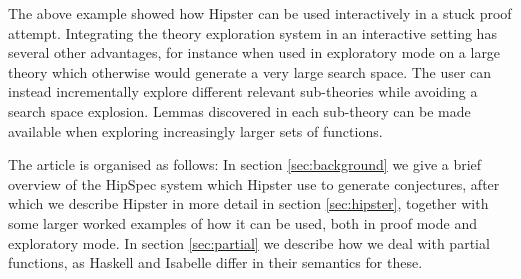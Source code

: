 

% 
The above example showed how Hipster can be used interactively in a stuck proof attempt. Integrating the theory exploration system in an interactive setting has several other advantages, for instance when used in exploratory mode on a large theory which otherwise would generate a very large search space. The user can instead incrementally explore different relevant sub-theories while avoiding a search space explosion. Lemmas discovered in each sub-theory can be made available when exploring increasingly larger sets of functions. 

The article is organised as follows: In section \ref{sec:background} we give a brief overview of the HipSpec system which Hipster use to generate conjectures, after which we describe Hipster in more detail in section \ref{sec:hipster}, together with some larger worked examples of how it can be used, both in proof mode and exploratory mode. In section \ref{sec:partial} we describe how we deal with partial functions, as Haskell and Isabelle differ in their semantics for these. 

